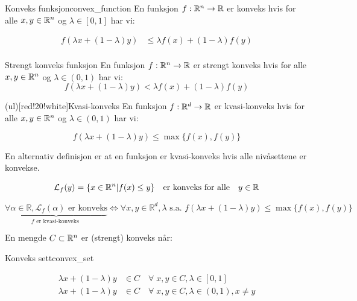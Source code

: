 \documentclass[11pt, a4paper]{article}
\begin{document}
\begin{definition}{Konveks funksjon}{convex_function}
    En funksjon $f: \mathbb{R}^n \to \mathbb{R}$ er konveks hvis for alle $x, y \in \mathbb{R}^n$ og $\lambda \in [0, 1]$ har vi:

    \begin{align*}
        f(\lambda x + (1 - \lambda)y) & \leq \lambda f(x) + (1 - \lambda)f(y) \tag{Konveks} \\
    \end{align*}

    \begin{filingbox}{Strengt konveks funksjon}
        En funksjon $f: \mathbb{R}^n \to \mathbb{R}$ er strengt konveks hvis for alle $x, y \in \mathbb{R}^n$ og $\lambda \in (0, 1)$ har vi:
        \[
            f(\lambda x + (1 - \lambda)y) < \lambda f(x) + (1 - \lambda)f(y)
        \]\label{def:strictly_convex}
    \end{filingbox}
    \begin{filingbox}(ul)[red!20!white]{Kvasi-konveks}
        En funksjon $f: \mathbb{R}^d \to \mathbb{R}$ er kvasi-konveks hvis for alle $x, y \in \mathbb{R}^n$ og $\lambda \in (0, 1)$ har vi:

        \[
            f(\lambda x + (1 - \lambda)y) \leq \max\{f(x), f(y)\}
        \]

        En alternativ definisjon er at en funksjon er kvasi-konveks hvis alle nivåsettene er konvekse.

        \[
            \mathcal{L}_f(y) = \{x \in \mathbb{R}^n | f(x) \leq y\} \quad \text{er konveks for alle} \quad y \in \mathbb{R}
        \]

        \[
            \boxed{\underbrace{\forall \alpha \in \mathbb{R}, \mathcal{L}_f(\alpha) \text{ er konveks}}_{f \text{ er kvasi-konveks }}\Longleftrightarrow \forall x, y \in \mathbb{R}^d,\lambda \text{ s.a. } f(\lambda x + (1-\lambda)y) \leq \max \{ f(x), f(y) \}}
        \]
    \end{filingbox}\label{def:quasi_convex}

\end{definition}

En mengde $C \subset \mathbb{R}^n$ er (strengt) konveks når:

\begin{definition}{Konveks sett}{convex_set}

    \begin{align*}
        \lambda x + (1 - \lambda)y & \in C \quad \forall \; x, y \in C, \lambda \in [0, 1] \tag{Konveks}                   \\
        \lambda x + (1 - \lambda)y & \in C \quad \forall \; x, y \in C, \lambda \in (0, 1), x \neq y \tag{Strengt konveks}
    \end{align*}

\end{definition}
\end{document}

